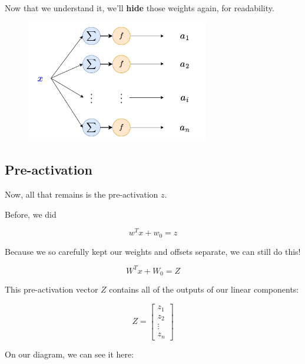         Now that we understand it, we'll \textbf{hide} those weights again, for readability.
        
        \begin{figure}[H]
            \centering
            \includegraphics[width=80mm,scale=0.4]{images/nn_images/remove_input.png}
        \end{figure}
        
    
    \subsection*{Pre-activation}
    
        Now, all that remains is the pre-activation $z$.
        
        Before, we did 
        
        \begin{equation}
            w^Tx + w_0 = z
        \end{equation}
        
        Because we so carefully kept our weights and offsets separate, we can still do this!
        
        \begin{equation}
            W^Tx + W_0 = Z
        \end{equation}
        
        This pre-activation vector $Z$ contains all of the outputs of our linear components:
        
        \begin{equation}
            Z = 
            \begin{bmatrix}
              z_1 \\ z_2 \\ \vdots \\ z_n
            \end{bmatrix}
        \end{equation}
        
        On our diagram, we can see it here:
        
